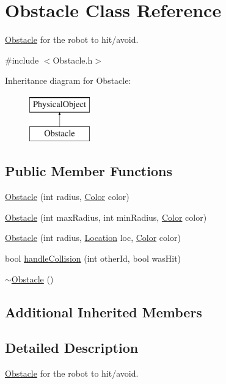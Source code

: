 \hypertarget{classObstacle}{\section{Obstacle Class Reference}
\label{classObstacle}
}


\hyperlink{classObstacle}{Obstacle} for the robot to hit/avoid.  




{\ttfamily \#include $<$Obstacle.\-h$>$}

Inheritance diagram for Obstacle\-:\begin{figure}[H]
\begin{center}
\leavevmode
\includegraphics[height=2.000000cm]{classObstacle}
\end{center}
\end{figure}
\subsection*{Public Member Functions}
\begin{DoxyCompactItemize}
\item 
\hyperlink{classObstacle_a05684b15f4ea925bd64601e534650ce7}{Obstacle} (int radius, \hyperlink{structColor}{Color} color)
\item 
\hyperlink{classObstacle_ae4f3c942fab622b38e32f1c2514f0924}{Obstacle} (int max\-Radius, int min\-Radius, \hyperlink{structColor}{Color} color)
\item 
\hyperlink{classObstacle_a28e78317f4f4b06fb6acec5a75f918c4}{Obstacle} (int radius, \hyperlink{structLocation}{Location} loc, \hyperlink{structColor}{Color} color)
\item 
bool \hyperlink{classObstacle_a6ea72857ac6d643be7bb3bd3a1a30995}{handle\-Collision} (int other\-Id, bool was\-Hit)
\item 
\hyperlink{classObstacle_af2f9cc9c6cff75dca0974fd5ac4f71a9}{$\sim$\-Obstacle} ()
\end{DoxyCompactItemize}
\subsection*{Additional Inherited Members}


\subsection{Detailed Description}
\hyperlink{classObstacle}{Obstacle} for the robot to hit/avoid. 

